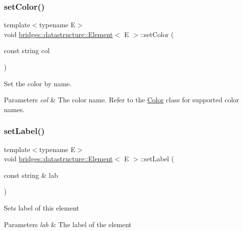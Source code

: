 \subsubsection{\texorpdfstring{set\+Color()}{setColor()}\hspace{0.1cm}{\footnotesize\ttfamily [2/2]}}
{\footnotesize\ttfamily template$<$typename E$>$ \\
void \hyperlink{classbridges_1_1datastructure_1_1_element}{bridges\+::datastructure\+::\+Element}$<$ E $>$\+::set\+Color (\begin{DoxyParamCaption}\item[{const string}]{col }\end{DoxyParamCaption})\hspace{0.3cm}{\ttfamily [inline]}}



Set the color by name. 


\begin{DoxyParams}{Parameters}
{\em col} & The color name. Refer to the \hyperlink{classbridges_1_1datastructure_1_1_color}{Color} class for supported color names. \\
\hline
\end{DoxyParams}
\mbox{\label{classbridges_1_1datastructure_1_1_element_a3a1fe4e3aa100125710c30f6e401e8c3}} 
\subsubsection{\texorpdfstring{set\+Label()}{setLabel()}}
{\footnotesize\ttfamily template$<$typename E$>$ \\
void \hyperlink{classbridges_1_1datastructure_1_1_element}{bridges\+::datastructure\+::\+Element}$<$ E $>$\+::set\+Label (\begin{DoxyParamCaption}\item[{const string \&}]{lab }\end{DoxyParamCaption})\hspace{0.3cm}{\ttfamily [inline]}}

Sets label of this element


\begin{DoxyParams}{Parameters}
{\em lab} & The label of the element \\
\hline
\end{DoxyParams}
\mbox{\label{classbridges_1_1datastructure_1_1_element_af3af017c9d6efcbc2124d0231b57e7a6}} 
